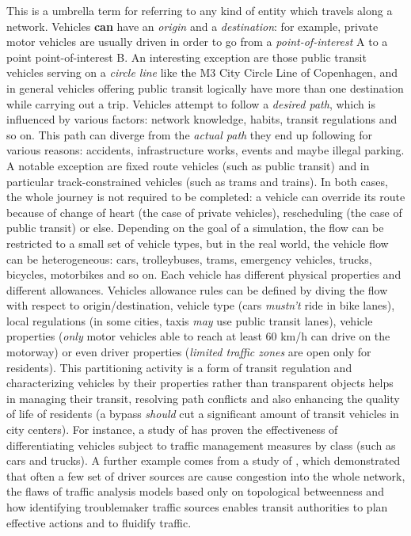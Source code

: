 This is a umbrella term for referring to any kind of entity which travels along a network.
Vehicles \textbf{can} have an \textit{origin} and a \textit{destination}: for example, private motor vehicles are usually driven in order to go from a \textit{point-of-interest} A to a point point-of-interest B.
An interesting exception are those public transit vehicles serving on a \textit{circle line} like the M3 City Circle Line of Copenhagen, and in general vehicles offering public transit logically have more than one destination while carrying out a trip.
Vehicles attempt to follow a \textit{desired path}, which is influenced by various factors: network knowledge, habits, transit regulations and so on.
This path can diverge from the \textit{actual path} they end up following for various reasons: accidents, infrastructure works, events and maybe illegal parking.
A notable exception are fixed route vehicles (such as public transit) and in particular track-constrained vehicles (such as trams and trains).
In both cases, the whole journey is not required to be completed: a vehicle can override its route because of change of heart (the case of private vehicles), rescheduling (the case of public transit) or else.
Depending on the goal of a simulation, the flow can be restricted to a small set of vehicle types, but in the real world, the vehicle flow can be heterogeneous: cars, trolleybuses, trams, emergency vehicles, trucks, bicycles, motorbikes and so on. Each vehicle has different physical properties and different allowances.
Vehicles allowance rules can be defined by diving the flow with respect to origin/destination, vehicle type (cars \textit{mustn't} ride in bike lanes), local regulations (in some cities, taxis \textit{may} use public transit lanes), vehicle properties (\textit{only} motor vehicles able to reach at least 60 km/h can drive on the motorway) or even driver properties (\textit{limited traffic zones} are open only for residents).
This partitioning activity is a form of transit regulation and characterizing vehicles by their properties rather than transparent objects helps in managing their transit, resolving path conflicts and also enhancing the quality of life of residents (a bypass \textit{should} cut a significant amount of transit vehicles in city centers).
For instance, a study of \citeauthor{schreiter2013vehicle} \cite{schreiter2013vehicle} has proven the effectiveness of differentiating vehicles subject to traffic management measures by class (such as cars and trucks).
A further example comes from a study of \citeauthor{wang2012understanding} \cite{wang2012understanding}, which demonstrated that often a few set of driver sources are cause congestion into the whole network, the flaws of traffic analysis models based only on topological betweenness and how identifying troublemaker traffic sources enables transit authorities to plan effective actions and to fluidify traffic.

